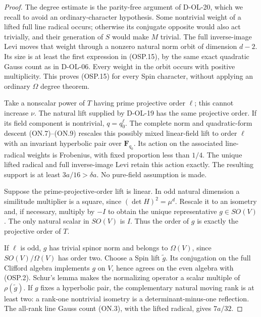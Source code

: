 \begin{proof}
The degree estimate is the parity-free argument of D-OL-20,
which we recall to avoid an ordinary-character hypothesis.
Some nontrivial weight of a lifted full line radical occurs;
otherwise its conjugate opposite would also act trivially,
and their generation of $S$ would make $M$ trivial.
The full inverse-image Levi moves that weight through a
nonzero natural norm orbit of dimension $d-2$.  Its size is
at least the first expression in (OSP.15), by the same exact
quadratic Gauss count as in D-OL-06.  Every weight in the orbit
occurs with positive multiplicity.  This proves (OSP.15) for
every Spin character, without applying an ordinary $\Omega$
degree theorem.

Take a nonscalar power of $T$ having prime projective order
$\ell$; this cannot increase $\nu$.  The natural lift supplied
by D-OL-19 has the same projective order.  If its field component
is nontrivial, $q=q_0^\ell$.  The complete norm and quadratic-form
descent (ON.7)--(ON.9) rescales this possibly mixed linear-field
lift to order $\ell$ with an invariant hyperbolic pair over
$\mathbf F_{q_0}$.  Its action on the associated line-radical
weights is Frobenius, with fixed proportion less than $1/4$.
The unique lifted radical and full inverse-image Levi retain
this action exactly.  The resulting support is at least
$3a/16>\delta a$.  No pure-field assumption is made.

Suppose the prime-projective-order lift is linear.
In odd natural dimension a similitude multiplier is a square,
since $(\det H)^2=\mu^d$.  Rescale it to an isometry and,
if necessary, multiply by $-I$ to obtain the unique
representative $g\in SO(V)$.  The only natural scalar in
$SO(V)$ is $I$.  Thus the order of $g$ is exactly the
projective order of $T$.

If $\ell$ is odd, $g$ has trivial spinor norm and belongs to
$\Omega(V)$, since $SO(V)/\Omega(V)$ has order two.
Choose a Spin lift $\widetilde g$.  Its conjugation on the
full Clifford algebra implements $g$ on $V$, hence agrees
on the even algebra with (OSP.2).  Schur's lemma makes the
normalizing operator a scalar multiple of $\rho(\widetilde g)$.
If $g$ fixes a hyperbolic pair, the complementary natural
moving rank is at least two: a rank-one nontrivial isometry
is a determinant-minus-one reflection.  The all-rank line
Gauss count (ON.3), with the lifted radical, gives $7a/32$.


\end{proof}
